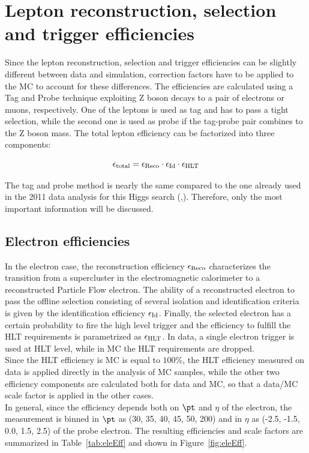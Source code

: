 \clearpage

\section{Lepton reconstruction, selection and trigger efficiencies}
\label{sec:Eff}

Since the lepton reconstruction, selection and trigger efficiencies can be slightly different between data and simulation,
correction factors have to be applied to the MC to account for these differences. The efficiencies are calculated using a Tag and Probe
technique exploiting Z boson decays to a pair of electrons or muons, respectively. One of the leptons is used as tag and has to pass a
tight selection, while the second one is used as probe if the tag-probe pair combines to the Z boson mass. The total lepton efficiency
can be factorized into three components:

\begin{equation}
\epsilon_{\textnormal{total}}=\epsilon_{\textnormal{Reco}}\cdot\epsilon_{\textnormal{Id}}\cdot\epsilon_{\textnormal{HLT}}
\end{equation}

The tag and probe method is nearly the same compared to the one already used in the 2011 data analysis for this Higgs search
(\cite{CMS-AN-12-029},\cite{CMS-AN-2012-021}). Therefore, only the most important information will be discussed.

\subsection{Electron efficiencies}\label{subsec:EffEle}
In the electron case, the reconstruction efficiency $\epsilon_{\textnormal{Reco}}$ characterizes the transition from a supercluster in the
electromagnetic calorimeter to a reconstructed Particle Flow electron. The ability of a reconstructed electron to pass the offline
selection consisting of several isolation and identification criteria is given by the identification efficiency $\epsilon_{\textnormal{Id}}$.
Finally, the selected electron has a certain probability to fire the high level trigger and the efficiency to fulfill the HLT requirements 
is parametrized as $\epsilon_{\textnormal{HLT}}$. In data, a single electron trigger is used at HLT level, while in MC the HLT requirements are dropped. \\
Since the HLT efficiency is MC is equal to $100\%$, the HLT efficiency measured on data is applied directly in the analysis of MC samples, 
while the other two efficiency components are calculated both for data and MC, so that a data/MC scale factor is applied in the other cases. \\
In general, since the efficiency depends both on $\pt$ and $\eta$ of the electron, the measurement is binned in $\pt$ as (30, 35, 40, 45, 50, 200)\GeVc 
and in $\eta$ as (-2.5, -1.5, 0.0, 1.5, 2.5) of the probe electron. The resulting efficiencies and scale factors are summarized in Table~\ref{tab:eleEff} and
shown in Figure~\ref{fig:eleEff}. 

